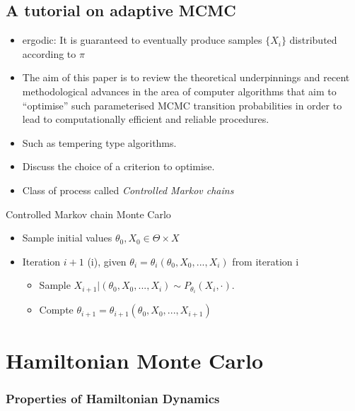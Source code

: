 \documentclass[
]{book}
\providecommand{\tightlist}{%
  \setlength{\itemsep}{0pt}\setlength{\parskip}{0pt}}
\theoremstyle{definition}
\theoremstyle{definition}
\theoremstyle{definition}
\theoremstyle{remark}
\begin{document}
\hypertarget{a-tutorial-on-adaptive-mcmc}{%
\section{A tutorial on adaptive MCMC}\label{a-tutorial-on-adaptive-mcmc}}

\citep{Andrieu:2008kh}

\begin{itemize}
\item
  ergodic: It is guaranteed to eventually produce samples \(\{X_i\}\) distributed according to \(\pi\)
\item
  The aim of this paper is to review the theoretical underpinnings and recent methodological advances in the area of computer algorithms that aim to ``optimise'' such parameterised MCMC transition probabilities in order to lead to computationally efficient and reliable procedures.
\item
  Such as tempering type algorithms.
\item
  Discuss the choice of a criterion to optimise.
\item
  Class of process called \emph{Controlled Markov chains}
\end{itemize}

Controlled Markov chain Monte Carlo

\begin{itemize}
\item
  Sample initial values \(\theta_0,X_0\in \Theta\times X\)
\item
  Iteration \(i+1\) (i), given \(\theta_i=\theta_i(\theta_0,X_0,...,X_i)\) from iteration i

  \begin{itemize}
  \tightlist
  \item
    Sample \(X_{i+1}|(\theta_0,X_0,...,X_i)\sim P_{\theta_i}(X_i,\cdot)\).
  \item
    Compte \(\theta_{i+1}=\theta_{i+1}(\theta_0,X_0,...,X_{i+1})\)
  \end{itemize}
\end{itemize}

\hypertarget{hamiltonian-monte-carlo}{%
\chapter{Hamiltonian Monte Carlo}\label{hamiltonian-monte-carlo}}

\hypertarget{properties-of-hamiltonian-dynamics}{%
\subsection{Properties of Hamiltonian Dynamics}\label{properties-of-hamiltonian-dynamics}}
\end{document}
